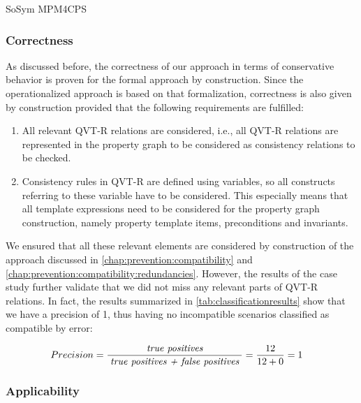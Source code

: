 \begin{copiedFrom}{SoSym MPM4CPS}
\subsubsection{Correctness}
As discussed before, the correctness of our approach in terms of conservative behavior is proven for the formal approach by construction.
Since the operationalized approach is based on that formalization, correctness is also given by construction provided that the following requirements are fulfilled:
\begin{enumerate}
    \item All relevant QVT-R relations are considered, i.e., all QVT-R relations are represented in the property graph to be considered as consistency relations to be checked.
    \item Consistency rules in QVT-R are defined using variables, so all constructs referring to these variable have to be considered. This especially means that all  template expressions need to be considered for the property graph construction, namely property template items, preconditions and invariants.
\end{enumerate}

We ensured that all these relevant elements are considered by construction of the approach discussed in \autoref{chap:prevention:compatibility} and \autoref{chap:prevention:compatibility:redundancies}.
However, the results of the case study further validate that we did not miss any relevant parts of QVT-R relations.
In fact, the results summarized in \autoref{tab:classificationresults} show that we have a precision of 1, thus having no incompatible scenarios classified as compatible by error:

\begin{align*}
    &
    Precision = \frac{\; \textit{true positives} \;}{\; \textit{true positives + false positives} \;} = \frac{12}{12+0} = 1
\end{align*}


\subsubsection{Applicability}


\end{copiedFrom}
